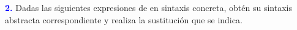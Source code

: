 \vspace*{0.5cm}
\textbf{\textcolor{blue}{2.}} Dadas las siguientes expresiones de 
en sintaxis concreta, obtén su sintaxis abstracta correspondiente y realiza
la sustitución que se indica.

